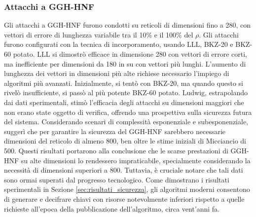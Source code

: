 \subsubsection{Attacchi a GGH-HNF}
Gli attacchi a GGH-HNF furono condotti su reticoli di dimensioni fino a 280, con vettori 
di errore di lunghezza variabile tra il 10\% e il 100\% del $\rho$. Gli attacchi furono
configurati con la tecnica di incorporamento, usando LLL, BKZ-20 e BKZ-60 potato. LLL 
si dimostrò efficace in 
dimensione 280 con vettori di errore corti, ma inefficiente per dimensioni da 180 in su 
con vettori più lunghi. L'aumento di lunghezza dei vettori in dimensioni più alte richiese 
necessario l'impiego 
di algoritmi più avanzati. Inizialmente, si tentò con BKZ-20, ma quando questo si rivelò 
insufficiente, si passò al più potente BKZ-60 potato.
Ludwig, estrapolando dai dati sperimentali, stimò l'efficacia degli attacchi su dimensioni 
maggiori che non erano state oggetto di verifica, offrendo una prospettiva sulla 
sicurezza futura del sistema. Considerando scenari di complessità esponenziale e 
subesponenziale, suggerì che per garantire la sicurezza del GGH-HNF sarebbero necessarie 
dimensioni del reticolo di almeno 800, ben oltre le stime iniziali di Micciancio di 500.
Questi risultati portarono alla conclusione che le scarse prestazioni di GGH-HNF su alte 
dimensioni lo rendessero impraticabile, specialmente considerando la necessità di 
dimensioni superiori a 800. Tuttavia, è cruciale notare che tali dati sono ormai 
superati dal progresso tecnologico. Come dimostrano i risultati sperimentali in Sezione 
\ref{sec:risultati_sicurezza}, gli algoritmi moderni consentono di generare e decifrare 
chiavi con risorse notevolmente inferiori rispetto a quelle richieste all'epoca della 
pubblicazione dell'algoritmo, circa vent'anni fa.